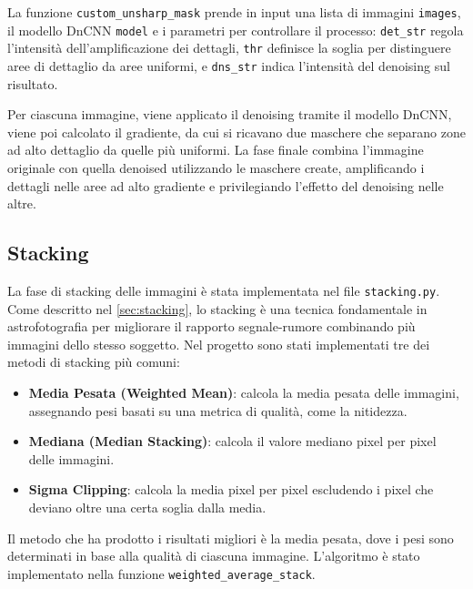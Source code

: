 La funzione \texttt{custom\_unsharp\_mask} prende in input una lista di immagini \texttt{images}, il modello DnCNN \texttt{model} e i parametri per controllare il processo: \texttt{det\_str} regola l'intensità dell'amplificazione dei dettagli, \texttt{thr} definisce la soglia per distinguere aree di dettaglio da aree uniformi, e \texttt{dns\_str} indica l'intensità del denoising sul risultato. 

Per ciascuna immagine, viene applicato il denoising tramite il modello DnCNN, viene poi calcolato il gradiente, da cui si ricavano due maschere che separano zone ad alto dettaglio da quelle più uniformi. La fase finale combina l'immagine originale con quella denoised utilizzando le maschere create, amplificando i dettagli nelle aree ad alto gradiente e privilegiando l'effetto del denoising nelle altre.

\subsection{Stacking} \label{subsec:stacking_impl}

La fase di stacking delle immagini è stata implementata nel file \texttt{stacking.py}. Come descritto nel \cref{sec:stacking}, lo stacking è una tecnica fondamentale in astrofotografia per migliorare il rapporto segnale-rumore combinando più immagini dello stesso soggetto. Nel progetto sono stati implementati tre dei metodi di stacking più comuni:

\begin{itemize}
    \item \textbf{Media Pesata (Weighted Mean)}: calcola la media pesata delle immagini, assegnando pesi basati su una metrica di qualità, come la nitidezza.
    \item \textbf{Mediana (Median Stacking)}: calcola il valore mediano pixel per pixel delle immagini.
    \item \textbf{Sigma Clipping}: calcola la media pixel per pixel escludendo i pixel che deviano oltre una certa soglia dalla media.
\end{itemize}

Il metodo che ha prodotto i risultati migliori è la media pesata, dove i pesi sono determinati in base alla qualità di ciascuna immagine. L'algoritmo è stato implementato nella funzione \texttt{weighted\_average\_stack}.

